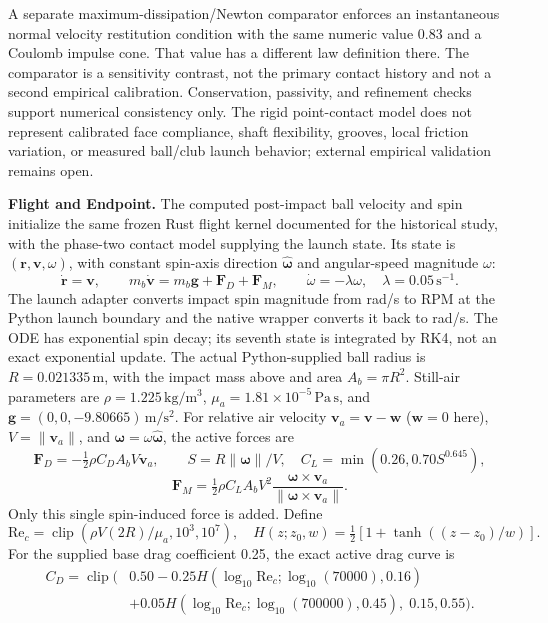 \documentclass[11pt,letterpaper]{article}
\begin{document}
A separate maximum-dissipation/Newton comparator enforces an instantaneous
normal velocity restitution condition with the same numeric value 0.83 and a
Coulomb impulse cone. That value has a different law definition there. The
comparator is a sensitivity contrast, not the primary contact history and not
a second empirical calibration. Conservation, passivity, and refinement
checks support numerical consistency only. The rigid point-contact model does
not represent calibrated face compliance, shaft flexibility, grooves, local
friction variation, or measured ball/club launch behavior; external empirical
validation remains open.

\textbf{Flight and Endpoint.} The computed post-impact ball velocity and spin
initialize the same frozen Rust flight kernel documented for the historical
study, with the phase-two contact model supplying the launch state. Its state
is $(\mathbf r,\mathbf v,\omega)$, with constant spin-axis direction
$\widehat{\boldsymbol\omega}$ and angular-speed magnitude $\omega$:
\[
 \dot{\mathbf r}=\mathbf v,\qquad
 m_b\dot{\mathbf v}=m_b\mathbf g+\mathbf F_D+\mathbf F_M,\qquad
 \dot\omega=-\lambda\omega,\quad \lambda=0.05\,\mathrm{s}^{-1}.
\]
The launch adapter converts impact spin magnitude from rad/s to RPM at the
Python launch boundary and the native wrapper converts it back to rad/s.
The ODE has exponential spin decay; its seventh state is integrated by RK4,
not an exact exponential update. The actual Python-supplied ball radius is
$R=0.021335$\,m, with the impact mass above and area $A_b=\pi R^2$.
Still-air parameters are $\rho=1.225\,\mathrm{kg/m^3}$,
$\mu_a=1.81\times10^{-5}\,\mathrm{Pa\,s}$, and
$\mathbf g=(0,0,-9.80665)\,\mathrm{m/s^2}$. For relative air velocity
$\mathbf v_a=\mathbf v-\mathbf w$ ($\mathbf w=0$ here), $V=\|\mathbf v_a\|$,
and $\boldsymbol\omega=\omega\widehat{\boldsymbol\omega}$, the active forces are
\[
 \mathbf F_D=-\tfrac12\rho C_D A_b V\mathbf v_a,\qquad
 S=R\|\boldsymbol\omega\|/V,\quad C_L=\min(0.26,0.70S^{0.645}),
\]
\[
 \mathbf F_M=\tfrac12\rho C_L A_b V^2
 \frac{\boldsymbol\omega\times\mathbf v_a}
 {\|\boldsymbol\omega\times\mathbf v_a\|}.
\]
Only this single spin-induced force is added. Define
\[
 \mathrm{Re}_c=\operatorname{clip}(\rho V(2R)/\mu_a,10^3,10^7),\quad
 H(z;z_0,w)=\tfrac12[1+\tanh((z-z_0)/w)].
\]
For the supplied base drag coefficient 0.25, the exact active drag curve is
\[
 \begin{split}
 C_D=\operatorname{clip}\bigl(&0.50-0.25H(\log_{10}\mathrm{Re}_c;
                                    \log_{10}(70000),0.16)\\
                         &+0.05H(\log_{10}\mathrm{Re}_c;
                                    \log_{10}(700000),0.45),\;0.15,0.55\bigr).
 \end{split}
\]
\end{document}
